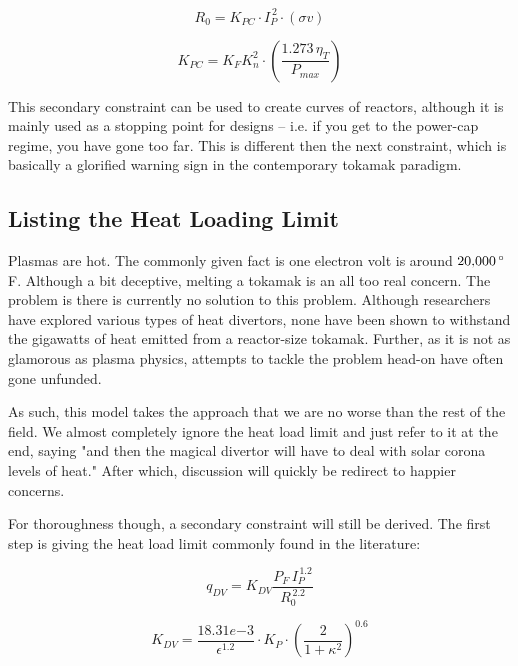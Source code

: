 \documentclass[11pt]{book}
\begin{document}
\begin{equation}
	R_0 = K_{PC} \cdot I_P^{\,2} \cdot (\sigma v)
\end{equation}

\begin{equation}
	K_{PC} = K_F K_n^2 \cdot \left( \frac{ 1.273 \, \eta_T }{ P_{max} } \right)
\end{equation}

This secondary constraint can be used to create curves of reactors, although it is mainly used as a stopping point for designs -- i.e. if you get to the power-cap regime, you have gone too far. This is different then the next constraint, which is basically a glorified warning sign in the contemporary tokamak paradigm.

\subsection{Listing the Heat Loading Limit}

Plasmas are hot. The commonly given fact is one electron volt is around $20\textnormal{,}000 \, {}^\circ$F. Although a bit deceptive, melting a tokamak is an all too real concern. The problem is there is currently no solution to this problem. Although researchers have explored various types of heat divertors, none have been shown to withstand the gigawatts of heat emitted from a reactor-size tokamak. Further, as it is not as glamorous as plasma physics, attempts to tackle the problem head-on have often gone unfunded.

As such, this model takes the approach that we are no worse than the rest of the field. We almost completely ignore the heat load limit and just refer to it at the end, saying "and then the magical divertor will have to deal with solar corona levels of heat." After which, discussion will quickly be redirect to happier concerns.

For thoroughness though, a secondary constraint will still be derived. The first step is giving the heat load limit commonly found in the literature:

\begin{equation}
  q_{DV} = K_{DV}  \frac{ P_F \, I_P^{\,1.2} }{ R_0^{\,2.2} }
\end{equation}

\begin{equation}
	K_{DV} = \frac{18.31e{-3}}{\epsilon^{1.2}} \cdot K_P \cdot \left( \frac{2}{1+\kappa^2} \right) ^ {0.6}
\end{equation}
\end{document}
